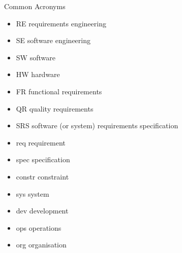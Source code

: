 
\begin{Slide}{Common Acronyms}
\footnotesize
\begin{itemize}
\item RE   \hfill requirements engineering
\item SE   \hfill software engineering
\item SW   \hfill software
\item HW   \hfill hardware
\item FR   \hfill functional requirements
\item QR   \hfill quality requirements
\item SRS  \hfill software (or system) requirements specification
\item req  \hfill requirement 
\item spec \hfill specification
\item constr \hfill constraint
\item sys  \hfill system
\item dev  \hfill development
\item ops  \hfill operations
\item org  \hfill organisation




\end{itemize}
\end{Slide}
